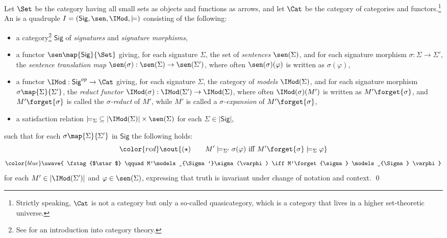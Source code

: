 \documentclass[10pt,fleqn,final]{scrreprt}
\newcommand{\Sig}{\mathsf{Sig}}
\newenvironment{definitions}[0]{\medskip }{}
\providecommand{\DIFadd}[1]{{\protect\color{blue}\uwave{#1}}} %
\providecommand{\DIFdel}[1]{{\protect\color{red}\sout{#1}}}                      %
\providecommand{\DIFaddbegin}{} %
\providecommand{\DIFaddend}{} %
\providecommand{\DIFdelbegin}{} %
\providecommand{\DIFdelend}{} %
\begin{document}
\begin{definitions}
\begin{definition}\label{def:inst}  Let $\Set$ be the
category having all small \textsc{}sets as objects and functions as
arrows, and let $\Cat$ be the category
of categories and functors.\footnote {Strictly speaking, $\Cat$ is not a
category but only a so-called quasicategory, which is a category that
lives in a higher set-theoretic universe.}
An
 \cite{GoguenBurstall92} is a quadruple $I=(\Sig,\sen,\IMod,{\models})$
consisting of the following:
%
\begin{itemize}
\item a category\footnote{See \cite{AHS,MacLane} for an introduction into category theory.} $\Sig$ of \emph{signatures} and \emph{signature morphisms},
\item a functor $\sen\map{\Sig}{\Set}$  giving, for each signature $\Sigma$, the set of
\emph{sentences} $\sen(\Sigma)$, and for each signature morphism
$\sigma:{\Sigma}\to{\Sigma'}$, the \emph{sentence translation map}
$\sen(\sigma):{\sen(\Sigma)}\to{\sen(\Sigma')}$, where often
$\sen(\sigma)(\varphi)$ is written as $\sigma(\varphi)$, \item a
functor $\IMod:{\Sig^{op}}\to{\Cat}$ giving, for each signature
$\Sigma$, the category of \emph{models} $\IMod(\Sigma)$, and for each
signature morphism $\sigma\map{\Sigma}{\Sigma'}$, the \emph{reduct
functor\/} $\IMod(\sigma):{\IMod(\Sigma')}\to {\IMod(\Sigma)}$, where
often $\IMod(\sigma)(M')$ is written as $M'\forget{\sigma}$, and
$M'\forget{\sigma}$ is called the \emph{$\sigma$-reduct} of $M'$,
while $M'$ is called a \emph{$\sigma$-expansion} of
$M'\forget{\sigma}$,
\item a satisfaction relation
${\models_{\Sigma}}\subseteq|{\IMod(\Sigma)|\times\sen(\Sigma)}$ for
each $\Sigma\in |\Sig|$,
\end{itemize}
%
such that for each $\sigma\map{\Sigma}{\Sigma'}$ in $\Sig$ the following  holds:
\DIFdelbegin \begin{displaymath}\DIFdel{
(\star) \qquad M'\models_{\Sigma'}\sigma(\varphi) \mbox{ iff }
M'\forget{\sigma} \models_{\Sigma} \varphi
}\end{displaymath}
\DIFdelend %
\DIFaddbegin \begin{equation}\DIFadd{
\tag{$\star$} \qquad M'\models_{\Sigma'}\sigma(\varphi) \iff
M'\forget{\sigma} \models_{\Sigma} \varphi
}\end{equation}
\DIFaddend for each $M'\in |\IMod(\Sigma')|$ and $\varphi\in \sen(\Sigma)$,
expressing that truth is invariant under change of notation and
context.  \qed
\end{definition}


\end{definitions}
\end{document}
